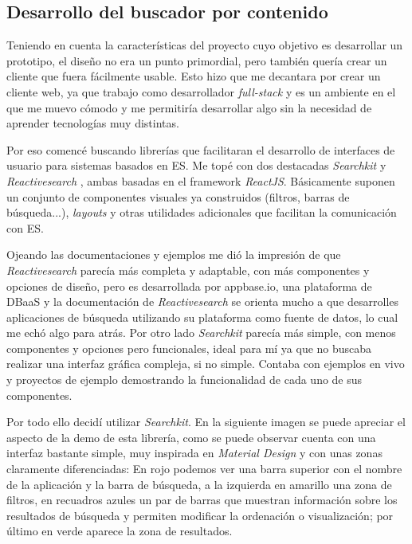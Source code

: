 \subsection{Desarrollo del buscador por contenido}
Teniendo en cuenta la características del proyecto cuyo objetivo es desarrollar un prototipo, el diseño no era un punto primordial, pero también quería crear un cliente que fuera fácilmente usable. Esto hizo que me decantara por crear un cliente web, ya que trabajo como desarrollador \textit{full-stack} y es un ambiente en el que me muevo cómodo y me permitiría desarrollar algo sin la necesidad de aprender tecnologías muy distintas.

Por eso comencé buscando librerías que facilitaran el desarrollo de interfaces de usuario para sistemas basados en \acrshort{ES}. Me topé con dos destacadas \textit{Searchkit} \cite{searchKit} y \textit{Reactivesearch} \cite{reactiveSearch}, ambas basadas en el \gls{framework} \textit{ReactJS}. Básicamente suponen un conjunto de componentes visuales ya construidos (filtros, barras de búsqueda...), \textit{layouts} y otras utilidades adicionales que facilitan la comunicación con \acrshort{ES}.

Ojeando las documentaciones y ejemplos me dió la impresión de que \textit{Reactivesearch} parecía más completa y adaptable, con más componentes y opciones de diseño, pero es desarrollada por appbase.io, una plataforma de \acrshort{DBaaS} y la documentación de \textit{Reactivesearch} se orienta mucho a que desarrolles aplicaciones de búsqueda utilizando su plataforma como fuente de datos, lo cual me echó algo para atrás. Por otro lado \textit{Searchkit} parecía más simple, con menos componentes y opciones pero funcionales, ideal para mí ya que no buscaba realizar una interfaz gráfica compleja, si no simple. Contaba con ejemplos en vivo y proyectos de ejemplo demostrando la funcionalidad de cada uno de sus componentes.

Por todo ello decidí utilizar \textit{Searchkit}. En la siguiente imagen se puede apreciar el aspecto de la demo de esta librería, como se puede observar cuenta con una interfaz bastante simple, muy inspirada en \textit{Material Design} \cite{materialDesign} y con unas zonas claramente diferenciadas: En rojo podemos ver una barra superior con el nombre de la aplicación y la barra de búsqueda, a la izquierda en amarillo una zona de filtros, en recuadros azules un par de barras que muestran información sobre los resultados de búsqueda y permiten modificar la ordenación o visualización; por último en verde aparece la zona de resultados.

